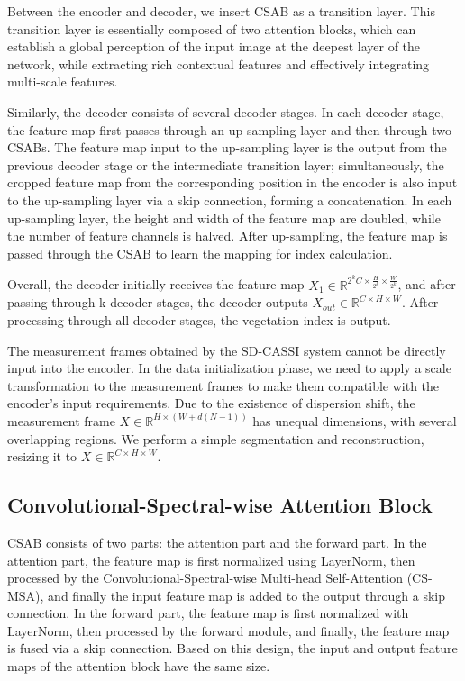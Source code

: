 \documentclass[preprint,review,12pt]{elsarticle}
\begin{document}
Between the encoder and decoder, we insert CSAB as a transition layer. This transition layer is essentially composed of two attention blocks, which can establish a global perception of the input image at the deepest layer of the network, while extracting rich contextual features and effectively integrating multi-scale features.

Similarly, the decoder consists of several decoder stages. In each decoder stage, the feature map first passes through an up-sampling layer and then through two CSABs. The feature map input to the up-sampling layer is the output from the previous decoder stage or the intermediate transition layer; simultaneously, the cropped feature map from the corresponding position in the encoder is also input to the up-sampling layer via a skip connection, forming a concatenation. In each up-sampling layer, the height and width of the feature map are doubled, while the number of feature channels is halved. After up-sampling, the feature map is passed through the CSAB to learn the mapping for index calculation.

Overall, the decoder initially receives the feature map $X_1 \in \mathbb{R}^{2^k C \times \frac{H}{2^k} \times \frac{W}{2^k}}$, and after passing through k decoder stages, the decoder outputs $X_{out} \in \mathbb{R}^{C \times H \times W}$. After processing through all decoder stages, the vegetation index is output.

The measurement frames obtained by the SD-CASSI system cannot be directly input into the encoder. In the data initialization phase, we need to apply a scale transformation to the measurement frames to make them compatible with the encoder's input requirements. Due to the existence of dispersion shift, the measurement frame $X \in \mathbb{R}^{H \times (W + d(N-1))}$ has unequal dimensions, with several overlapping regions. We perform a simple segmentation and reconstruction, resizing it to $X \in \mathbb{R}^{C \times H \times W}$.

\subsection{Convolutional-Spectral-wise Attention Block}

CSAB consists of two parts: the attention part and the forward part. In the attention part, the feature map is first normalized using LayerNorm, then processed by the Convolutional-Spectral-wise Multi-head Self-Attention (CS-MSA), and finally the input feature map is added to the output through a skip connection. In the forward part, the feature map is first normalized with LayerNorm, then processed by the forward module, and finally, the feature map is fused via a skip connection. Based on this design, the input and output feature maps of the attention block have the same size.
\end{document}
